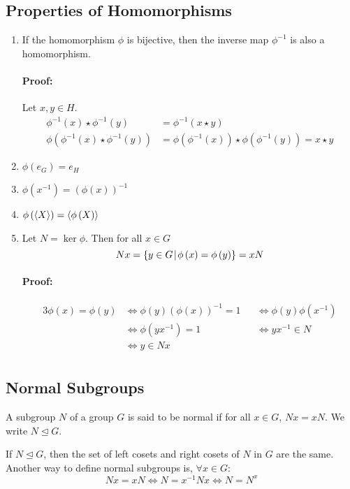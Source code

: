 \documentclass[12pt, oneside]{book}
\DeclarePairedDelimiter{\evdel}{\langle}{\rangle}
\newcommand{\ev}{\evdel}
\newcommand{\given}{\: \vline \:}
\begin{document}
\subsection{Properties of Homomorphisms}
\begin{enumerate}
	\item If the homomorphism \(\phi\) is bijective, then the inverse map \(\phi^{-1}\) is also a homomorphism.
	      \paragraph{Proof:} Let \(x,y \in H\).
	      \begin{align*}
		      \phi^{-1} \left( x \right) \star \phi^{-1} \left( y \right)                   & = \phi^{-1} \left( x \star y \right)                                                                        \\
		      \phi \left( \phi^{-1}\left( x \right) \star \phi^{-1}\left( y \right) \right) & = \phi \left( \phi^{-1} \left(x\right)\right) \star \phi \left( \phi^{-1} \left(y\right)\right) = x \star y
	      \end{align*}
	\item \(\phi\left(e_G\right) = e_H\)
	\item \(\phi\left(x^{-1}\right) = \left(\phi \left(x\right)\right)^{-1}\)
	\item \(\phi\left(\ev{X}\right) = \ev{\phi\left(X\right)}\)
	\item Let \(N = \ker \phi\). Then for all \(x \in G\)
	      \[ Nx = \{y \in G \given \phi \left(x\right) = \phi \left(y\right) \} = xN \]
	      \paragraph{Proof:}
	      \begin{alignat*}{3}
		      \phi \left(x\right) = \phi \left(y\right) & \Longleftrightarrow \phi \left(y\right) \left(\phi \left(x\right)\right)^{-1} = 1 &  & \Longleftrightarrow \phi \left(y\right) \phi\left(x^{-1}\right) \\
		                                                & \Longleftrightarrow \phi \left( yx^{-1} \right) = 1                               &  & \Longleftrightarrow yx^{-1} \in N                               \\
		                                                & \Longleftrightarrow y \in Nx                                                      &  &                                                                 \\
	      \end{alignat*}
\end{enumerate}
\subsection{Normal Subgroups}
A subgroup \(N\) of a group \(G\) is said to be normal if for all \(x \in G\), \(Nx = xN\).
We write \(N \trianglelefteq G\).

If \(N \trianglelefteq G\), then the set of left cosets and right cosets of \(N\) in \(G\) are the same.
Another way to define normal subgroups is, \( \forall x \in G\):
\[ Nx = xN \Longleftrightarrow N = x^{-1} Nx \Longleftrightarrow N = N^x \]
\end{document}
